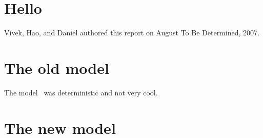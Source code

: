 \documentclass[10pt,titlepage,draft,twocolumn]{article}
\begin{document}
\section{Hello}
Vivek, Hao, and Daniel authored this report on August To Be Determined, 2007.

\section{The old model}
The model~\cite{lalit:mechanics} was deterministic and not very cool.

\section{The new model}


\end{document}
